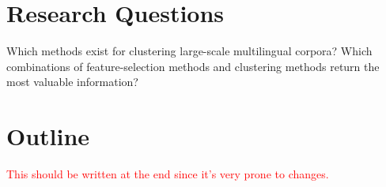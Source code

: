 \section{Research Questions}
Which methods exist for clustering large-scale multilingual corpora? Which combinations of feature-selection methods and clustering methods return the most valuable information?

\section{Outline}
\textcolor{red}{This should be written at the end since it's very prone to changes.}